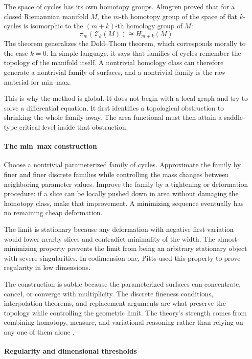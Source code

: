 The space of cycles has its own homotopy groups. Almgren proved that for a closed Riemannian manifold $M$, the $m$-th homotopy group of the space of flat $k$-cycles is isomorphic to the $(m+k)$-th homology group of $M$:
\[
 \pi_m(\mathcal Z_k(M))\cong H_{m+k}(M).
\]
The theorem generalizes the Dold--Thom theorem, which corresponds morally to the case $k=0$. In simple language, it says that families of cycles remember the topology of the manifold itself. A nontrivial homology class can therefore generate a nontrivial family of surfaces, and a nontrivial family is the raw material for min--max.

This is why the method is global. It does not begin with a local graph and try to solve a differential equation. It first identifies a topological obstruction to shrinking the whole family away. The area functional must then attain a saddle-type critical level inside that obstruction.

\paragraph{The min--max construction}

Choose a nontrivial parameterized family of cycles. Approximate the family by finer and finer discrete families while controlling the mass changes between neighboring parameter values. Improve the family by a tightening or deformation procedure: if a slice can be locally pushed down in area without damaging the homotopy class, make that improvement. A minimizing sequence eventually has no remaining cheap deformation.

The limit is stationary because any deformation with negative first variation would lower nearby slices and contradict minimality of the width. The almost-minimizing property prevents the limit from being an arbitrary stationary object with severe singularities. In codimension one, Pitts used this property to prove regularity in low dimensions.

The construction is subtle because the parameterized surfaces can concentrate, cancel, or converge with multiplicity. The discrete fineness conditions, interpolation theorems, and replacement arguments are what preserve the topology while controlling the geometric limit. The theory's strength comes from combining homotopy, measure, and variational reasoning rather than relying on any one of them alone \cite{almgren_pitts_min_max_theory_ref1,almgren_pitts_min_max_theory_ref5}.

\paragraph{Regularity and dimensional thresholds}

